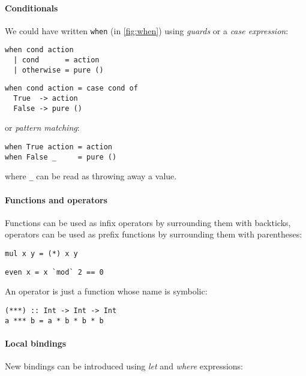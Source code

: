 \paragraph{Conditionals}
We could have written \verb|when| (in \cref{fig:when}) using \emph{guards} or a
\emph{case expression}:

\begin{multicols}{2}
\begin{verbatim}
when cond action
  | cond      = action
  | otherwise = pure ()
\end{verbatim}
\begin{verbatim}
when cond action = case cond of
  True  -> action
  False -> pure ()
\end{verbatim}
\end{multicols}

\noindent
or \emph{pattern matching}:

\begin{verbatim}
when True action = action
when False _     = pure ()
\end{verbatim}

\noindent
where \verb|_| can be read as throwing away a value.

\paragraph{Functions and operators}
Functions can be used as infix operators by surrounding them with backticks,
operators can be used as prefix functions by surrounding them with parentheses:

\begin{multicols}{2}
\begin{verbatim}
mul x y = (*) x y
\end{verbatim}
\begin{verbatim}
even x = x `mod` 2 == 0
\end{verbatim}
\end{multicols}

An operator is just a function whose name is symbolic:

\begin{verbatim}
(***) :: Int -> Int -> Int
a *** b = a * b * b * b
\end{verbatim}

\paragraph{Local bindings}
New bindings can be introduced using \emph{let} and \emph{where} expressions:

